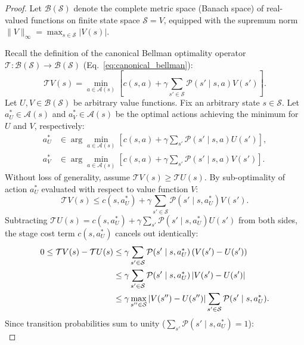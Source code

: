 \documentclass[11pt,a4paper]{article}
\begin{document}
\begin{proof}
Let $\mathcal{B}(\mathcal{S})$ denote the complete metric space (Banach space) of real-valued functions on finite state space $\mathcal{S} = V$, equipped with the supremum norm $\|V\|_\infty = \max_{s \in \mathcal{S}} |V(s)|$.

Recall the definition of the canonical Bellman optimality operator $\mathcal{T}: \mathcal{B}(\mathcal{S}) \to \mathcal{B}(\mathcal{S})$ (Eq.~\eqref{eq:canonical_bellman}):
\begin{equation}
\mathcal{T} V(s) = \min_{a \in \mathcal{A}(s)} \left[ c(s, a) + \gamma \sum_{s' \in \mathcal{S}} \mathcal{P}(s' \mid s, a) V(s') \right].
\end{equation}
Let $U, V \in \mathcal{B}(\mathcal{S})$ be arbitrary value functions. Fix an arbitrary state $s \in \mathcal{S}$. Let $a_U^* \in \mathcal{A}(s)$ and $a_V^* \in \mathcal{A}(s)$ be the optimal actions achieving the minimum for $U$ and $V$, respectively:
\begin{align}
a_U^* &\in \arg\min_{a \in \mathcal{A}(s)} \left[ c(s, a) + \gamma \sum_{s'} \mathcal{P}(s' \mid s, a) U(s') \right], \\
a_V^* &\in \arg\min_{a \in \mathcal{A}(s)} \left[ c(s, a) + \gamma \sum_{s'} \mathcal{P}(s' \mid s, a) V(s') \right].
\end{align}
Without loss of generality, assume $\mathcal{T} V(s) \ge \mathcal{T} U(s)$. By sub-optimality of action $a_U^*$ evaluated with respect to value function $V$:
\begin{equation}
\mathcal{T} V(s) \le c(s, a_U^*) + \gamma \sum_{s' \in \mathcal{S}} \mathcal{P}(s' \mid s, a_U^*) V(s').
\end{equation}
Subtracting $\mathcal{T} U(s) = c(s, a_U^*) + \gamma \sum_{s'} \mathcal{P}(s' \mid s, a_U^*) U(s')$ from both sides, the stage cost term $c(s, a_U^*)$ cancels out identically:
\begin{align}
0 \le \mathcal{T} V(s) - \mathcal{T} U(s) &\le \gamma \sum_{s' \in \mathcal{S}} \mathcal{P}(s' \mid s, a_U^*) \left( V(s') - U(s') \right) \notag \\
&\le \gamma \sum_{s' \in \mathcal{S}} \mathcal{P}(s' \mid s, a_U^*) \left| V(s') - U(s') \right| \notag \\
&\le \gamma \max_{s'' \in \mathcal{S}} \left| V(s'') - U(s'') \right| \sum_{s' \in \mathcal{S}} \mathcal{P}(s' \mid s, a_U^*).
\end{align}
Since transition probabilities sum to unity ($\sum_{s'} \mathcal{P}(s' \mid s, a_U^*) = 1$):
\begin{equation}

\end{equation}
\end{proof}
\end{document}
